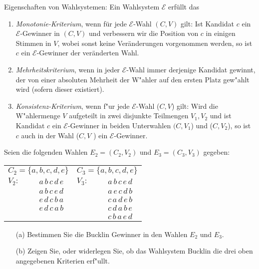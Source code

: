 \documentclass[a4paper,12pt,titlepage,oneside]{article}
\newcommand\bc{\begin{center}}
\newcommand\ec{\end{center}}
\newcommand\be{\begin{enumerate}}
\newcommand\ee{\end{enumerate}}
\renewcommand{\labelenumi}{(\alph{enumi})}
\newcommand{\vs}{\mathcal{E}}
\newcommand{\wahl}{(C,V)}
\begin{document}
Eigenschaften von Wahlsystemen: Ein Wahlsystem $\vs$ erf\"ullt das 
\renewcommand{\labelenumi}{(\arabic{enumi})}
\be
	\item \emph{Monotonie-Kriterium}, wenn f\"ur jede $\vs$-Wahl $\wahl$ gilt: 
	Ist Kandidat $c$ ein $\vs$-Gewinner in $\wahl$ und verbessern wir die Position von $c$ in 
	einigen Stimmen in $V$, wobei sonst keine Ver\"anderungen vorgenommen werden, so ist $c$ 
	ein $\vs$-Gewinner der ver\"anderten Wahl. 
 \item \emph{Mehrheitskriterium}, wenn in jeder $\vs$-Wahl immer derjenige Kandidat gewinnt, der von einer absoluten Mehrheit der W"ahler auf den ersten Platz gew"ahlt wird (sofern dieser existiert).
\item \emph{Konsistenz-Kriterium}, wenn f"ur jede $\vs$-Wahl ($C, V$) gilt: Wird die W"ahlermenge $V$ aufgeteilt in zwei disjunkte Teilmengen $V_1, V_2$ und ist Kandidat $c$ ein $\vs$-Gewinner
in beiden Unterwahlen $(C, V_1$) und ($C, V_2$), so ist $c$ auch in der Wahl ($C, V$ ) ein $\vs$-Gewinner.
\ee
Seien die folgenden Wahlen $E_2=(C_2,V_2)$ und $E_3=(C_3,V_3)$ gegeben:
\bc
\begin{tabular}{|lc|lc|}
\hline
\multicolumn{2}{|l|}{$C_2 =\{a,b,c,d,e\}$}& \multicolumn{2}{l|}{$C_3 = \{a,b,c,d,e\}$ }	\\
$V_2:$ 	& $a\,b\,c\,d\,e$			& $V_3:$ 	& $a\,b\,c\,e\,d$		\\
	& $a\,b\,c\,e\,d$			& 		& $a\,e\,c\,d\,b$		\\
	& $e\,d\,c\,b\,a$			& 		& $c\,a\,d\,e\,b$		\\
	& $e\,d\,c\,a\,b$			& 		& $c\,d\,a\,b\,e$		\\
	& 				& 		& $c\,b\,a\,e\,d$		\\\hline
\end{tabular}
\ec
\begin{enumerate}
\item[(a)] Bestimmen Sie die Bucklin Gewinner in den Wahlen $E_2$ und $E_3$.
\item[(b)] Zeigen Sie, oder widerlegen Sie, ob das Wahlsystem Bucklin die drei oben angegebenen Kriterien erf"ullt.
\end{enumerate}

\vspace{0.5cm}
\end{document}
